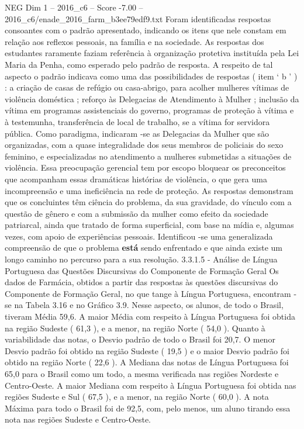 \begin{textsample}{NEG Dim 1 – 2016\_c6 – Score -7.00 – 2016\_c6/enade\_2016\_farm\_b3ee79edf9.txt}
Foram identificadas respostas consoantes com o padrão apresentado, indicando os itens que nele constam em relação aos reflexos pessoais, na família e na sociedade.
As respostas dos estudantes raramente faziam referência à organização protetiva instituída pela Lei Maria da Penha, como esperado pelo padrão de resposta.
A respeito de tal aspecto o padrão indicava como uma das possibilidades de respostas ( item ‘ b ’ ) : a criação de casas de refúgio ou casa-abrigo, para acolher mulheres vítimas de violência doméstica ; reforço às Delegacias de Atendimento à Mulher ; inclusão da vítima em programas assistenciais do governo, programas de proteção à vítima e à testemunha, transferência de local de trabalho, se a vítima for servidora pública.
Como paradigma, indicaram -se as Delegacias da Mulher que são organizadas, com a quase integralidade dos seus membros de policiais do sexo feminino, e especializadas no atendimento a mulheres submetidas a situações de violência.
Essa preocupação gerencial tem por escopo bloquear os preconceitos que acompanham essas dramáticas histórias de violência, o que gera uma incompreensão e uma ineficiência na rede de proteção.
As respostas demonstram que os concluintes têm ciência do problema, da sua gravidade, do vínculo com a questão de gênero e com a submissão da mulher como efeito da sociedade patriarcal, ainda que tratado de forma superficial, com base na mídia e, algumas vezes, com apoio de experiências pessoais.
Identificou -se uma generalizada compreensão de que o problema \textbf{está} sendo enfrentado e que ainda existe um longo caminho no percurso para a sua resolução. 3.3.1.5 - Análise de Língua Portuguesa das Questões Discursivas do Componente de Formação Geral Os dados de Farmácia, obtidos a partir das respostas às questões discursivas do Componente de Formação Geral, no que tange à Língua Portuguesa, encontram -se na Tabela 3.16 e no Gráfico 3.9.
Nesse aspecto, os alunos, de todo o Brasil, tiveram Média 59,6.
A maior Média com respeito à Língua Portuguesa foi obtida na região Sudeste ( 61,3 ), e a menor, na região Norte ( 54,0 ).
Quanto à variabilidade das notas, o Desvio padrão de todo o Brasil foi 20,7.
O menor Desvio padrão foi obtido na região Sudeste ( 19,5 ) e o maior Desvio padrão foi obtido na região Norte ( 22,6 ).
A Mediana das notas de Língua Portuguesa foi 65,0 para o Brasil como um todo, a mesma verificada nas regiões Nordeste e Centro-Oeste.
A maior Mediana com respeito à Língua Portuguesa foi obtida nas regiões Sudeste e Sul ( 67,5 ), e a menor, na região Norte ( 60,0 ).
A nota Máxima para todo o Brasil foi de 92,5, com, pelo menos, um aluno tirando essa nota nas regiões Sudeste e Centro-Oeste.

\end{textsample}

